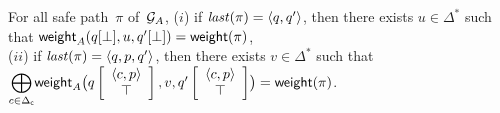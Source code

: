 %


\begin{lemma}[Correctness]\label{algo-correct}
For all safe path~$\pi$ of~$\mathcal{G}_A$,  %
($i$) if $\last(\pi) = \< q, q'>$, %
then there exists $u \in \Delta^*$ such that 
$\mathsf{weight}_A(q[\bot], u, q'[\bot]) = \mathsf{weight}(\pi)$,\\
%
($ii$) if $\last(\pi) = \< q, p, q'>$, %
then there exists $v \in \Delta^*$ such that \\
${\displaystyle\bigoplus_{c \in \Deltac}}
 \weight_A\bigl(\configup{q}{\< c, p> \stackup \top }, v, \configup{q'}{\<c, p> \stackup \top}\bigr)
 = \weight(\pi)$.
\end{lemma}
%
